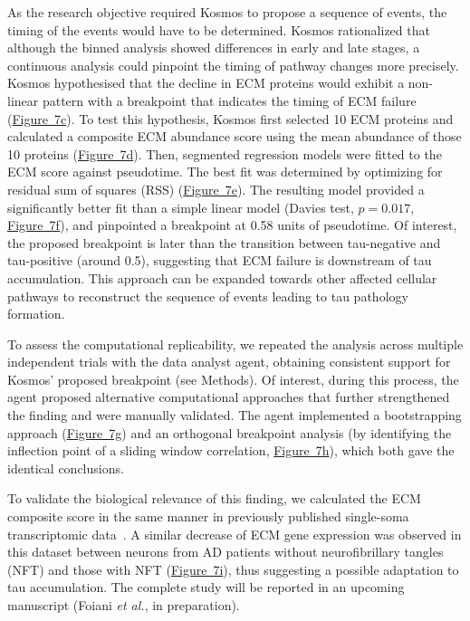 \documentclass{article}
\begin{document}
As the research objective required Kosmos to propose a sequence of events, the timing of the events would have to be determined. Kosmos rationalized that although the binned analysis showed differences in early and late stages, a continuous analysis could pinpoint the timing of pathway changes more precisely. Kosmos hypothesised that the decline in ECM proteins would exhibit a non-linear pattern with a breakpoint that indicates the timing of ECM failure (\hyperref[fig:fig7]{Figure~7c}). To test this hypothesis, Kosmos first selected 10 ECM proteins and calculated a composite ECM abundance score using the mean abundance of those 10 proteins (\hyperref[fig:fig7]{Figure~7d}). Then, segmented regression models were fitted to the ECM score against pseudotime. The best fit was determined by optimizing for residual sum of squares (RSS) (\hyperref[fig:fig7]{Figure~7e}). The resulting model provided a significantly better fit than a simple linear model (Davies test, $p = 0.017$, \hyperref[fig:fig7]{Figure~7f}), and pinpointed a breakpoint at 0.58 units of pseudotime. Of interest, the proposed breakpoint is later than the transition between tau-negative and tau-positive (around 0.5), suggesting that ECM failure is downstream of tau accumulation. This approach can be expanded towards other affected cellular pathways to reconstruct the sequence of events leading to tau pathology formation.

To assess the computational replicability, we repeated the analysis across multiple independent trials with the data analyst agent, obtaining consistent support for Kosmos' proposed breakpoint (see Methods). Of interest, during this process, the agent proposed alternative computational approaches that further strengthened the finding and were manually validated. The agent implemented a bootstrapping approach (\hyperref[fig:fig7]{Figure~7g}) and an orthogonal breakpoint analysis (by identifying the inflection point of a sliding window correlation, \hyperref[fig:fig7]{Figure~7h}), which both gave the identical conclusions. 

To validate the biological relevance of this finding, we calculated the ECM composite score in the same manner in previously published single-soma transcriptomic data~\cite{otero-garcia_molecular_2022}. A similar decrease of ECM gene expression was observed in this dataset between neurons from AD patients without neurofibrillary tangles (NFT) and those with NFT (\hyperref[fig:fig7]{Figure~7i}), thus suggesting a possible adaptation to tau accumulation. The complete study will be reported in an upcoming manuscript (Foiani \textit{et al.}, in preparation).
\end{document}
